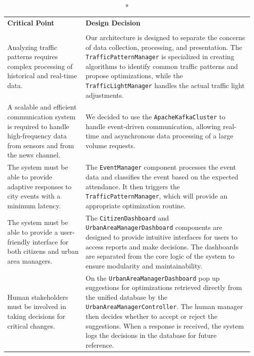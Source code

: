 \documentclass[12pt, a4paper, twoside, openright]{report}
\begin{document}
\begin{longtable}{>{\raggedright\arraybackslash}p{} >{\raggedright\arraybackslash}p{}}
\caption*{Critical Points and Design Decisions} \\
\toprule
\textbf{Critical Point} & \textbf{Design Decision} \\
\midrule
\endhead
\midrule
\multicolumn{2}{r}{\textit{Continues on next page}} \\
\endfoot
\bottomrule
\endlastfoot

Analyzing traffic patterns requires complex processing of historical and real-time data. &
Our architecture is designed to separate the concerns of data collection, processing, and presentation. The \texttt{TrafficPatternManager} is specialized in creating algorithms to identify common traffic patterns and propose optimizations, while the \texttt{TrafficLightManager} handles the actual traffic light adjustments. \\

A scalable and efficient communication system is required to handle high-frequency data from sensors and from the news channel. &
We decided to use the \texttt{ApacheKafkaCluster} to handle event-driven communication, allowing real-time and asynchronous data processing of a large volume requests. \\

The system must be able to provide adaptive responses to city events with a minimum latency. &
The \texttt{EventManager} component processes the event data and classifies the event based on the expected attendance. It then triggers the \texttt{TrafficPatternManager}, which will provide an appropriate optimization routine. \\

The system must be able to provide a user-friendly interface for both citizens and urban area managers. &
The \texttt{CitizenDashboard} and \texttt{UrbanAreaManagerDashboard} components are designed to provide intuitive interfaces for users to access reports and make decisions. The dashboards are separated from the core logic of the system to ensure modularity and maintainability. \\

Human stakeholders must be involved in taking decisions for critical changes. &
On the \texttt{UrbanAreaManagerDashboard} pop up suggestions for optimizations retrieved directly from the unified database by the \texttt{UrbanAreaManagerController}. The human manager then decides whether to accept or reject the suggestions. When a response is received, the system logs the decisions in the database for future reference. \\


\end{longtable}
\end{document}
